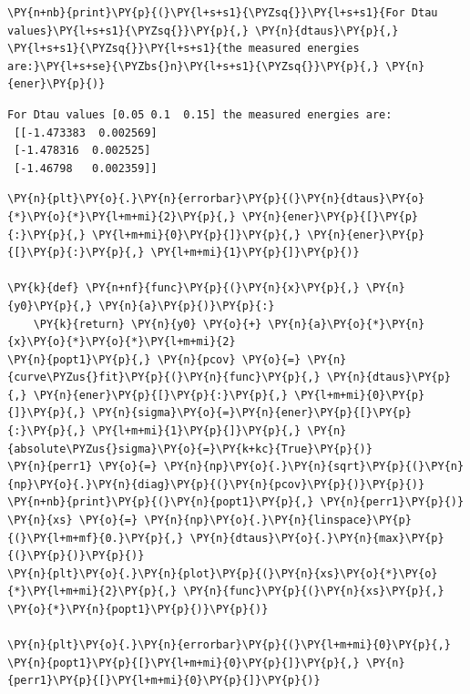     \begin{tcolorbox}[breakable, size=fbox, boxrule=1pt, pad at break*=1mm,colback=cellbackground, colframe=cellborder]
\begin{Verbatim}[commandchars=\\\{\}]
\PY{n+nb}{print}\PY{p}{(}\PY{l+s+s1}{\PYZsq{}}\PY{l+s+s1}{For Dtau values}\PY{l+s+s1}{\PYZsq{}}\PY{p}{,} \PY{n}{dtaus}\PY{p}{,} \PY{l+s+s1}{\PYZsq{}}\PY{l+s+s1}{the measured energies are:}\PY{l+s+se}{\PYZbs{}n}\PY{l+s+s1}{\PYZsq{}}\PY{p}{,} \PY{n}{ener}\PY{p}{)}
\end{Verbatim}
\end{tcolorbox}

    \begin{Verbatim}[commandchars=\\\{\}]
For Dtau values [0.05 0.1  0.15] the measured energies are:
 [[-1.473383  0.002569]
 [-1.478316  0.002525]
 [-1.46798   0.002359]]
    \end{Verbatim}

    \begin{tcolorbox}[breakable, size=fbox, boxrule=1pt, pad at break*=1mm,colback=cellbackground, colframe=cellborder]
\begin{Verbatim}[commandchars=\\\{\}]
\PY{n}{plt}\PY{o}{.}\PY{n}{errorbar}\PY{p}{(}\PY{n}{dtaus}\PY{o}{*}\PY{o}{*}\PY{l+m+mi}{2}\PY{p}{,} \PY{n}{ener}\PY{p}{[}\PY{p}{:}\PY{p}{,} \PY{l+m+mi}{0}\PY{p}{]}\PY{p}{,} \PY{n}{ener}\PY{p}{[}\PY{p}{:}\PY{p}{,} \PY{l+m+mi}{1}\PY{p}{]}\PY{p}{)}

\PY{k}{def} \PY{n+nf}{func}\PY{p}{(}\PY{n}{x}\PY{p}{,} \PY{n}{y0}\PY{p}{,} \PY{n}{a}\PY{p}{)}\PY{p}{:}
    \PY{k}{return} \PY{n}{y0} \PY{o}{+} \PY{n}{a}\PY{o}{*}\PY{n}{x}\PY{o}{*}\PY{o}{*}\PY{l+m+mi}{2}
\PY{n}{popt1}\PY{p}{,} \PY{n}{pcov} \PY{o}{=} \PY{n}{curve\PYZus{}fit}\PY{p}{(}\PY{n}{func}\PY{p}{,} \PY{n}{dtaus}\PY{p}{,} \PY{n}{ener}\PY{p}{[}\PY{p}{:}\PY{p}{,} \PY{l+m+mi}{0}\PY{p}{]}\PY{p}{,} \PY{n}{sigma}\PY{o}{=}\PY{n}{ener}\PY{p}{[}\PY{p}{:}\PY{p}{,} \PY{l+m+mi}{1}\PY{p}{]}\PY{p}{,} \PY{n}{absolute\PYZus{}sigma}\PY{o}{=}\PY{k+kc}{True}\PY{p}{)}
\PY{n}{perr1} \PY{o}{=} \PY{n}{np}\PY{o}{.}\PY{n}{sqrt}\PY{p}{(}\PY{n}{np}\PY{o}{.}\PY{n}{diag}\PY{p}{(}\PY{n}{pcov}\PY{p}{)}\PY{p}{)}
\PY{n+nb}{print}\PY{p}{(}\PY{n}{popt1}\PY{p}{,} \PY{n}{perr1}\PY{p}{)}
\PY{n}{xs} \PY{o}{=} \PY{n}{np}\PY{o}{.}\PY{n}{linspace}\PY{p}{(}\PY{l+m+mf}{0.}\PY{p}{,} \PY{n}{dtaus}\PY{o}{.}\PY{n}{max}\PY{p}{(}\PY{p}{)}\PY{p}{)}
\PY{n}{plt}\PY{o}{.}\PY{n}{plot}\PY{p}{(}\PY{n}{xs}\PY{o}{*}\PY{o}{*}\PY{l+m+mi}{2}\PY{p}{,} \PY{n}{func}\PY{p}{(}\PY{n}{xs}\PY{p}{,} \PY{o}{*}\PY{n}{popt1}\PY{p}{)}\PY{p}{)}

\PY{n}{plt}\PY{o}{.}\PY{n}{errorbar}\PY{p}{(}\PY{l+m+mi}{0}\PY{p}{,} \PY{n}{popt1}\PY{p}{[}\PY{l+m+mi}{0}\PY{p}{]}\PY{p}{,} \PY{n}{perr1}\PY{p}{[}\PY{l+m+mi}{0}\PY{p}{]}\PY{p}{)}
\end{Verbatim}
\end{tcolorbox}

